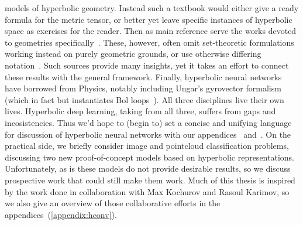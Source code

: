 models of hyperbolic geometry. Instead such a textbook would either give a
ready formula for the metric tensor, or better yet leave specific instances of
hyperbolic space as exercises for the reader. Then as main reference serve the
works devoted to geometries specifically~\cite{thurstonThree}.
These, however, often omit set-theoretic formulations working instead on purely
geometric grounds, or use otherwise differing
notation~\cite{beardonGeometryDiscrete}. Such sources provide many insights,
yet it takes an effort to connect these results with the general framework.
Finally, hyperbolic neural networks have borrowed from Physics, notably
including Ungar's gyrovector formalism (which in fact but instantiates Bol
loops~\cite{sabinin1995gyrogroups}).  All three disciplines live their own
lives. Hyperbolic deep learning, taking from all three, suffers from gaps and
incosistencies. Thus we'd hope to (begin to) set a concise and unifying
language for discussion of hyperbolic neural networks with our
appendices~ and~.  On
the practical side, we briefly consider image and pointcloud classification
problems, discussing two new proof-of-concept models based on hyperbolic
representations.  Unfortunately, as is these models do not provide desirable
results, so we discuss prospective work that could still make them work.  Much
of this thesis is inspired by the work done in collaboration with Max Kochurov
and Rasoul Karimov, so we also give an overview of those collaborative efforts
in the appendices~(\autoref{appendix:hconv}).

